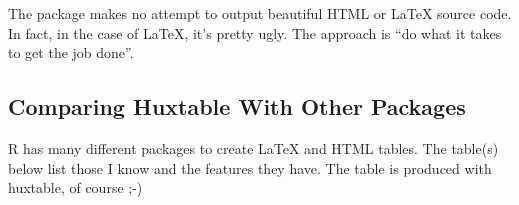 \documentclass[]{article}
\begin{document}
The package makes no attempt to output beautiful HTML or LaTeX source
code. In fact, in the case of LaTeX, it's pretty ugly. The approach is
``do what it takes to get the job done''.

\hypertarget{comparing-huxtable-with-other-packages}{%
\subsection{Comparing Huxtable With Other
Packages}\label{comparing-huxtable-with-other-packages}}

R has many different packages to create LaTeX and HTML tables. The
table(s) below list those I know and the features they have. The table
is produced with huxtable, of course ;-)

 
  \providecommand{\huxb}[2]{\arrayrulecolor[RGB]{#1}\global\arrayrulewidth=#2pt}
  \providecommand{\huxvb}[2]{\color[RGB]{#1}\vrule width #2pt}
  \providecommand{\huxtpad}[1]{\rule{0pt}{\baselineskip+#1}}
  \providecommand{\huxbpad}[1]{\rule[-#1]{0pt}{#1}}
\end{document}
